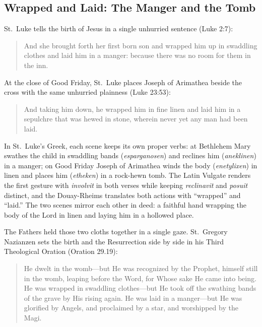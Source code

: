 \subsection{Wrapped and Laid: The Manger and the Tomb}

St.~Luke tells the birth of Jesus in a single unhurried sentence (Luke 2:7):

\begin{quote}
And she brought forth her first born son and wrapped him up in swaddling
clothes and laid him in a manger: because there was no room for them in the
inn.
\end{quote}

At the close of Good Friday, St.~Luke places Joseph of Arimathea beside the
cross with the same unhurried plainness (Luke 23:53):

\begin{quote}
And taking him down, he wrapped him in fine linen and laid him in a sepulchre
that was hewed in stone, wherein never yet any man had been laid.
\end{quote}

In St.~Luke's Greek, each scene keeps its own proper verbs: at Bethlehem Mary
swathes the child in swaddling bands (\textit{esparganosen}) and reclines him
(\textit{aneklinen}) in a manger; on Good Friday Joseph of Arimathea winds the
body (\textit{enetylixen}) in linen and places him (\textit{etheken}) in a
rock-hewn tomb. The Latin Vulgate renders the first gesture with
\textit{involvit} in both verses while keeping \textit{reclinavit} and
\textit{posuit} distinct, and the Douay-Rheims translates both actions with
``wrapped'' and ``laid.'' The two scenes mirror each other in deed: a faithful
hand wrapping the body of the Lord in linen and laying him in a hollowed place.

The Fathers held those two cloths together in a single gaze. St.~Gregory
Nazianzen sets the birth and the Resurrection side by side in his Third
Theological Oration (Oration 29.19):

\begin{quote}
He dwelt in the womb---but He was recognized by the Prophet, himself still in
the womb, leaping before the Word, for Whose sake He came into being. He was
wrapped in swaddling clothes---but He took off the swathing bands of the grave
by His rising again. He was laid in a manger---but He was glorified by Angels,
and proclaimed by a star, and worshipped by the Magi.
\end{quote}

